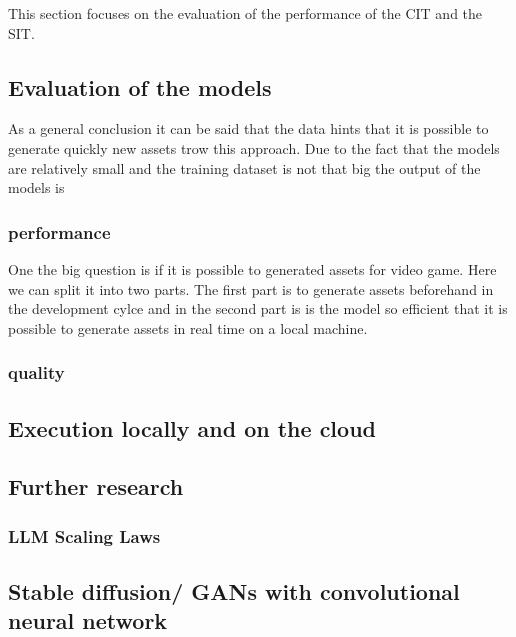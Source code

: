 
This section focuses on the evaluation of the performance of the CIT and the SIT.

\subsection{Evaluation of the models}
    
    As a general conclusion it can be said that the data hints that it is possible to generate quickly new assets trow this approach. Due to the fact that the models are relatively small and the training dataset is not that big the output of the models is 

    \subsubsection{performance}
    One the big question is if it is possible to generated assets for video game. Here we can split it into two parts. The first part is to generate assets beforehand in the development cylce and in the second part is is the model so efficient that it is possible to generate assets in real time on a local machine.

    \subsubsection{quality}


\subsection{Execution locally and on the cloud}
    
    

\subsection{Further research}

    \subsubsection{LLM Scaling Laws}


    \subsection{Stable diffusion/ GANs with convolutional neural network}